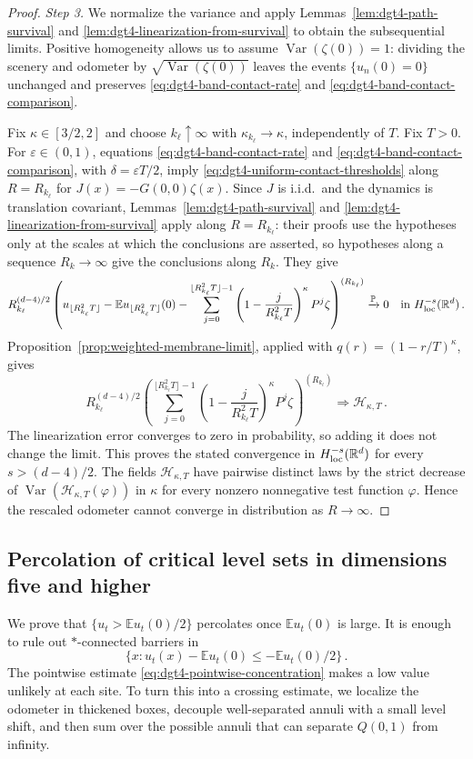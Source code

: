 \documentclass[11pt]{amsart}
\theoremstyle{plain}
\theoremstyle{definition}
\newcommand{\R}{\mathbb{R}}
\newcommand{\E}{\mathbb{E}}
\renewcommand{\P}{\mathbb{P}}
\DeclareMathOperator{\Var}{Var}
\begin{document}
\begin{proof}
	\par\smallskip\noindent\emph{Step 3.} We normalize the variance and apply
	Lemmas~\ref{lem:dgt4-path-survival} and
	\ref{lem:dgt4-linearization-from-survival} to obtain the subsequential
	limits.
	Positive homogeneity allows us to assume $\Var(\zeta(0))=1$: dividing the
	scenery and odometer by $\sqrt{\Var(\zeta(0))}$ leaves the events
	$\{u_n(0)=0\}$ unchanged and preserves \eqref{eq:dgt4-band-contact-rate} and
	\eqref{eq:dgt4-band-contact-comparison}.

	Fix $\kappa\in[3/2,2]$ and choose $k_\ell\uparrow\infty$ with
	$\kappa_{k_\ell}\to\kappa$, independently of $T$. Fix $T>0$. For
	$\varepsilon\in(0,1)$, equations
	\eqref{eq:dgt4-band-contact-rate} and
	\eqref{eq:dgt4-band-contact-comparison}, with
	$\delta=\varepsilon T/2$, imply
	\eqref{eq:dgt4-uniform-contact-thresholds} along
	$R=R_{k_\ell}$ for $J(x)=-G(0,0)\zeta(x)$.
	Since $J$ is i.i.d.\ and the dynamics is translation covariant,
	Lemmas~\ref{lem:dgt4-path-survival} and
	\ref{lem:dgt4-linearization-from-survival} apply along $R=R_{k_\ell}$: their
	proofs use the hypotheses only at the scales at which the conclusions are
	asserted, so hypotheses along a sequence $R_k\to\infty$ give the
	conclusions along $R_k$. They give
	\[
	R_{k_\ell}^{(d-4)/2}
	\left(
	u_{\lfloor R_{k_\ell}^2T\rfloor}-
	\E u_{\lfloor R_{k_\ell}^2T\rfloor}(0)
	-
	\sum_{j=0}^{\lfloor R_{k_\ell}^2T\rfloor-1}
	\left(1-\frac{j}{R_{k_\ell}^2T}\right)^\kappa P^j\zeta
	\right)^{(R_{k_\ell})}
	\xrightarrow{\P}0
	\quad\text{in }H^{-s}_{\rm loc}(\R^d)\, .
	\]
	Proposition~\ref{prop:weighted-membrane-limit}, applied with
	$q(r)=(1-r/T)^\kappa$, gives
	\[
		R_{k_\ell}^{(d-4)/2}
		\left(
		\sum_{j=0}^{\lfloor R_{k_\ell}^2T\rfloor-1}
		\left(1-\frac{j}{R_{k_\ell}^2T}\right)^\kappa P^j\zeta
		\right)^{(R_{k_\ell})}
		\Longrightarrow\mathcal H_{\kappa,T}\, .
	\]
	The linearization error converges to zero in probability, so adding it does
	not change the limit. This proves the stated convergence in
	$H^{-s}_{\rm loc}(\R^d)$ for every $s>(d-4)/2$.
	The fields $\mathcal H_{\kappa,T}$ have pairwise distinct laws by the strict decrease of
	$\Var(\mathcal H_{\kappa,T}(\varphi))$ in $\kappa$ for every nonzero nonnegative test
	function $\varphi$. Hence the rescaled odometer
	cannot converge in distribution as $R\to\infty$.
\end{proof}
	\subsection{Percolation of critical level sets in dimensions five and higher}\label{sec:high-d-nontriviality}
		We prove that 
		$\{u_t>\E u_t(0)/2\}$ percolates once $\E u_t(0)$ is large. It is
		enough to rule out $\ast$-connected barriers in
		\[
			\{x:u_t(x)-\E u_t(0)\leq-\E u_t(0)/2\}\, .
		\]
		The pointwise estimate \eqref{eq:dgt4-pointwise-concentration} makes a low value unlikely at each site. To turn this into a crossing estimate,
		we localize the odometer in thickened boxes, decouple well-separated
		annuli with a small level shift, and then sum over the possible annuli
		that can separate $Q(0,1)$ from infinity.
\end{document}
